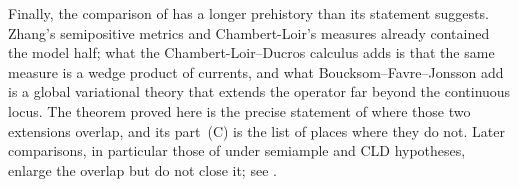 Finally, the comparison of  has a longer prehistory
than its statement suggests.  Zhang's semipositive metrics \cite{Zhang1995}
and Chambert-Loir's measures \cite{CL06} already contained the model half;
what the Chambert-Loir--Ducros calculus \cite{CLD12,CLD25} adds is that the
same measure is a wedge product of currents, and what
Boucksom--Favre--Jonsson \cite{BFJ15,BFJ16} add is a global variational
theory that extends the operator far beyond the continuous locus.  The
theorem proved here is the precise statement of where those two extensions
overlap, and its part~(C) is the list of places where they do not.  Later
comparisons, in particular those of \cite{BE21} under semiample and CLD
hypotheses, enlarge the overlap but do not close it; see
.
